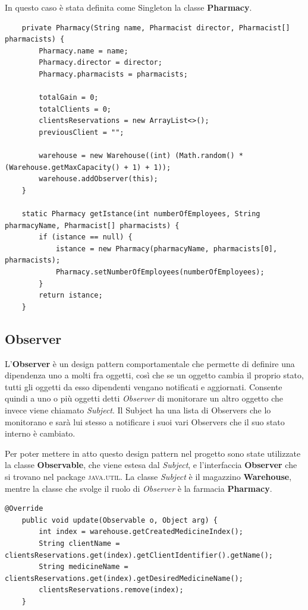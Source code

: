 \documentclass[a4paper, 10pt]{report}
\begin{document}
In questo caso è stata definita come Singleton la classe \textbf{Pharmacy}.\\
\begin{lstlisting}
    private Pharmacy(String name, Pharmacist director, Pharmacist[] pharmacists) {
        Pharmacy.name = name;
        Pharmacy.director = director;
        Pharmacy.pharmacists = pharmacists;

        totalGain = 0;
        totalClients = 0;
        clientsReservations = new ArrayList<>();
        previousClient = "";

        warehouse = new Warehouse((int) (Math.random() * (Warehouse.getMaxCapacity() + 1) + 1));
        warehouse.addObserver(this);
    }

    static Pharmacy getIstance(int numberOfEmployees, String pharmacyName, Pharmacist[] pharmacists) {
        if (istance == null) {
            istance = new Pharmacy(pharmacyName, pharmacists[0], pharmacists);
            Pharmacy.setNumberOfEmployees(numberOfEmployees);
        }
        return istance;
    }
\end{lstlisting}
\subsection{Observer}
L'\textbf{Observer} è un design pattern comportamentale che permette di definire una dipendenza uno a molti fra oggetti, così che se un oggetto cambia il proprio stato, tutti gli oggetti da esso dipendenti vengano notificati e aggiornati. Consente quindi a uno o più oggetti detti \textit{Observer} di monitorare un altro oggetto che invece viene chiamato \textit{Subject}. Il Subject ha una lista di Observers che lo monitorano e sarà lui stesso a notificare i suoi vari Observers che il suo stato interno è cambiato.

Per poter mettere in atto questo design pattern nel progetto sono state utilizzate la classe \textbf{Observable}, che viene estesa dal \textit{Subject}, e l'interfaccia \textbf{Observer} che si trovano nel package \textsc{java.util}. La classe \textit{Subject} è il magazzino \textbf{Warehouse}, mentre la classe che svolge il ruolo di \textit{Observer} è la farmacia \textbf{Pharmacy}.\\
\begin{lstlisting}
@Override
    public void update(Observable o, Object arg) {
        int index = warehouse.getCreatedMedicineIndex();
        String clientName = clientsReservations.get(index).getClientIdentifier().getName();
        String medicineName = clientsReservations.get(index).getDesiredMedicineName();
        clientsReservations.remove(index);
    }
\end{lstlisting}
\end{document}
